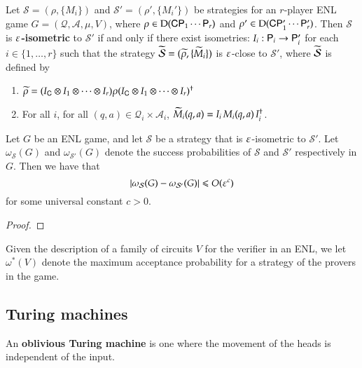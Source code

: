 \begin{definition}
	Let $\mathcal{S} = (\rho,\{M_i\})$ and $\mathcal{S}' = (\rho',\{M_i'\})$ be strategies for an $r$-player ENL game $G = (\mathcal{Q},\mathcal{A},\mu,V)$, where $\rho \in \mathrm{D}({\mathsf{C}} {\mathsf{P}}_1 \cdots {\mathsf{P}}_r)$ and $\rho' \in \mathrm{D}({\mathsf{C}} {\mathsf{P}}_1' \cdots {\mathsf{P}}_r')$. Then $\mathcal{S}$ is \textbf{$\varepsilon$-isometric} to $\mathcal{S}'$ if and only if there exist isometries: $I_i : {\mathsf{P}}_i \to {\mathsf{P}}_i'$ for each $i\in\{1,\ldots,r\}$ such that the strategy $\widetilde{\mathcal{S}} = (\widetilde{\rho}, \{ \widetilde{M}_i \})$ is $\varepsilon$-close to $\mathcal{S}'$, where $\widetilde{\mathcal{S}}$ is defined by
	\begin{enumerate}
		\item $\widetilde{\rho} = (I_{\mathsf{C}} \otimes I_1 \otimes \cdots \otimes I_r) \rho (I_{\mathsf{C}} \otimes I_1 \otimes \cdots \otimes I_r)^\dagger$
		\item For all $i$, for all $(q,a) \in \mathcal{Q}_i \times \mathcal{A}_i$, $\widetilde{M}_i(q,a) = I_i \, M_i(q,a)\, I_i^\dagger$.
	\end{enumerate}
\end{definition}


\begin{lemma}
\label{lem:close_strategies}
	Let $G$ be an ENL game, and let $\mathcal{S}$ be a strategy that is $\varepsilon$-isometric to $\mathcal{S}'$. Let $\omega_{\mathcal{S}}(G)$ and $\omega_{\mathcal{S}'}(G)$ denote the success probabilities of $\mathcal{S}$ and $\mathcal{S}'$ respectively in $G$. Then we have that
	\[
		\left\lvert \omega_{\mathcal{S}}(G) - \omega_{\mathcal{S}'}(G) \right\rvert \leqslant O(\varepsilon^c)
	\]
	for some universal constant $c > 0$.
\end{lemma}
\begin{proof}
\end{proof}

\begin{definition}
Given the description of a family of circuits $V$ for the verifier in an ENL, we let $\omega^*(V)$ denote the maximum acceptance probability for a strategy of the provers in the game. 
\end{definition}


\subsection{Turing machines}
\label{sec:turing_machines}

An \textbf{oblivious Turing machine} is one where the movement of the heads is independent of the input.

